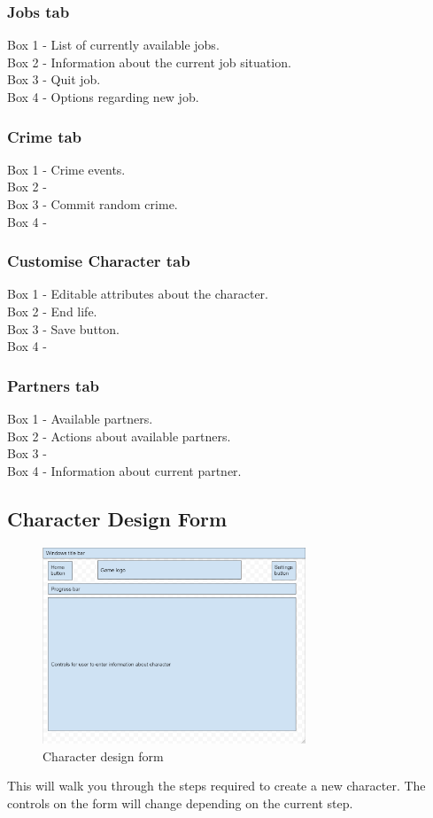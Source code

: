 \subsubsection{Jobs tab}
Box 1 - List of currently available jobs.\\
Box 2 - Information about the current job situation. \\
Box 3 - Quit job.\\
Box 4 - Options regarding new job.

\subsubsection{Crime tab}
Box 1 - Crime events.\\
Box 2 - \\
Box 3 - Commit random crime.\\
Box 4 - 

\subsubsection{Customise Character tab}
Box 1 - Editable attributes about the character.\\
Box 2 - End life.\\
Box 3 - Save button.\\
Box 4 - 

\subsubsection{Partners tab}
Box 1 - Available partners.\\
Box 2 - Actions about available partners.\\
Box 3 - \\
Box 4 - Information about current partner.

\subsection{Character Design Form}
\begin{figure}[H]
    \centering
    \includegraphics[width=0.7\textwidth]{images/design/characterDesigner.png}
    \caption{Character design form}
    \label{fig:design-characterDesigner}
\end{figure}
This will walk you through the steps required to create a new character. The controls on the form will change depending on the current step. 

